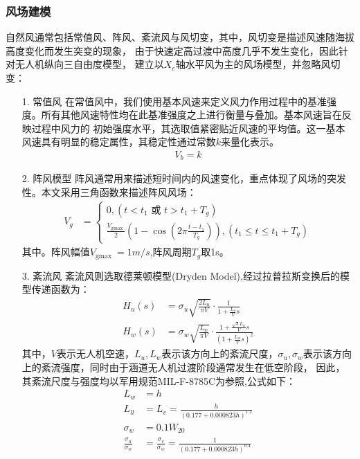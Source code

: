\subsubsection{风场建模}
自然风通常包括常值风、阵风、紊流风与风切变，其中，风切变是描述风速随海拔高度变化而发生突变的现象，
由于快速定高过渡中高度几乎不发生变化，因此针对无人机纵向三自由度模型，
建立以$X_{e}$轴水平风为主的风场模型，并忽略风切变：
\begin{itemize}
    \item [1.] 常值风
    在常值风中，我们使用基本风速来定义风力作用过程中的基准强度。所有其他风速特性均在此基准强度之上进行衡量与叠加。基本风速旨在反映过程中风力的
    初始强度水平，其选取值紧密贴近风速的平均值。这一基本风速具有明显的稳定属性，其稳定性通过常数$k$来量化表示。
    \begin{align}
        V_{b} = k
    \end{align}
    \item [2.] 阵风模型
    阵风通常用来描述短时间内的风速变化，重点体现了风场的突发性。本文采用三角函数来描述阵风风场：
    \begin{align}
        V_{g} & = \left\{\begin{array}{l}
        0,\left(t<t_{1} \text { 或 } t>t_{1}+T_{g}\right) \\
        \frac{V_{\text {gmax }}}{2}\left(1-\cos \left(2 \pi \frac{t-t_{1}}{T_{g}}\right)\right),\left(t_{1} \leq t \leq t_{1}+T_{g}\right)
        \end{array}\right.
    \end{align}
    其中。阵风幅值$V_{\text {gmax }}=1m/s$,阵风周期$T_{g}$取1s。
    \item [3.] 紊流风
    紊流风则选取德莱顿模型(Dryden Model)\cite{abichandani2020wind},经过拉普拉斯变换后的模型传递函数为：
    \begin{align}
        H_{u}(s) & = \sigma_{u} \sqrt{\frac{2 L_{u}}{\pi V}} \cdot \frac{1}{1+\frac{L_{u}}{V} s}\\
        H_{w}(s) & = \sigma_{w} \sqrt{\frac{L_{w}}{\pi V}} \cdot \frac{1+\frac{\sqrt{3} L_{w}}{V} s}{\left(1+\frac{L_{w}}{V} s\right)^{2}}
    \end{align}
    其中，$V$表示无人机空速，$L_{u},L_{w}$表示该方向上的紊流尺度，$\sigma_{u},\sigma_{w}$表示该方向上的紊流强度，同时由于涵道无人机过渡阶段通常发生在低空阶段，
    因此，其紊流尺度与强度均以军用规范MIL-F-8785C为参照,公式如下：
    \begin{align}
        L_{w} & = h \\
        L_{l l} & = L_{v} = \frac{h}{(0.177+0.000823 h)^{1.2}}\\
        \sigma_{w} & = 0.1 W_{20} \\
        \frac{\sigma_{u}}{\sigma_{w}} &= \frac{\sigma_{v}}{\sigma_{w}} = \frac{1}{(0.177+0.000823 h)^{0.4}}
    \end{align}
\end{itemize}

